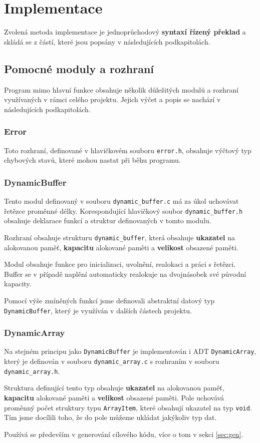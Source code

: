 \documentclass[a4paper, 11pt]{article}
\begin{document}
	\section{Implementace}
	Zvolená metoda implementace je jednoprůchodový \textbf{syntaxí řízený překlad} a skládá se z částí, které jsou popsány v následujících podkapitolách.

	\subsection{Pomocné moduly a rozhraní}
	Program mimo hlavní funkce obsahuje několik důležitých modulů a rozhraní využívaných v rámci celého projektu. Jejich výčet a popis se nachází v následujících podkapitolách.
	\subsubsection{Error}
	Toto rozhraní, definované v hlavičkovém souboru \texttt{error.h}, obsahuje výčtový typ chybových stavů, které mohou nastat při běhu programu.


	\subsubsection{DynamicBuffer}
	Tento modul definovaný v souboru \texttt{dynamic\_buffer.c} má za úkol uchovávat řetězce proměnné délky.
	Korespondující hlavičkový soubor \texttt{dynamic\_buffer.h} obsahuje deklarace funkcí a struktur definovaných v tomto modulu.
	\par\noindent Rozhraní obsahuje strukturu \texttt{dynamic\_buffer}, která obsahuje \textbf{ukazatel} na alokovanou paměť, \textbf{kapacitu} alokované paměti a \textbf{velikost} obsazené paměti.
	\par\noindent Modul obsahuje funkce pro inicializaci, uvolnění, realokaci a práci s řetězci. Buffer se v případě naplění automaticky realokuje na dvojnásobek své původní kapacity.
	\par\noindent Pomocí výše zmíněných funkcí jsme definovali abstraktní datový typ \texttt{DynamicBuffer}, který je využíván v dalších částech projektu.


	\subsubsection{DynamicArray}
	Na stejném principu jako \texttt{DynamicBuffer} je implementován i ADT \texttt{DynamicArray}, který je definován v souboru \texttt{dynamic\_array.c} s rozhraním v souboru \texttt{dynamic\_array.h}.
	\par\noindent Struktura definující tento typ obsahuje \textbf{ukazatel} na alokovanou paměť, \textbf{kapacitu} alokované paměti a \textbf{velikost} obsazené paměti. Pole uchovává proměnný počet struktury typu \texttt{ArrayItem}, které obsahují ukazatel na typ \texttt{void}. Tím jsme docílili toho, že do pole můžeme ukládat jakýkoliv typ dat.
	\par\noindent Používá se především v generování cílového kódu, více o tom v sekci \ref{sec:gen}.
\end{document}
